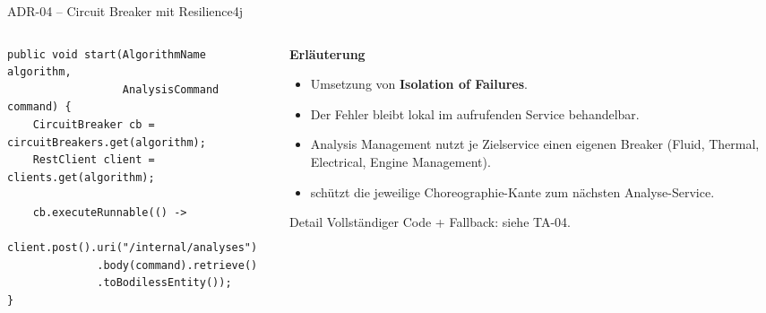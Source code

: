 \begin{frame}[fragile]{ADR-04 -- Circuit Breaker mit Resilience4j}
  \begin{columns}[T,onlytextwidth]
    \begin{column}{0.54\textwidth}
      \begin{lstlisting}[style=java]
public void start(AlgorithmName algorithm,
                  AnalysisCommand command) {
    CircuitBreaker cb = circuitBreakers.get(algorithm);
    RestClient client = clients.get(algorithm);

    cb.executeRunnable(() ->
        client.post().uri("/internal/analyses")
              .body(command).retrieve()
              .toBodilessEntity());
}
      \end{lstlisting}
    \end{column}
    \begin{column}{0.42\textwidth}
      \textbf{Erläuterung}
      \begin{itemize}
        \item Umsetzung von \textbf{Isolation of Failures}.
        \item Der Fehler bleibt lokal im aufrufenden Service behandelbar.
        \item Analysis Management nutzt je Zielservice einen eigenen Breaker
          (Fluid, Thermal, Electrical, Engine Management).
        \item {} schützt die jeweilige Choreographie-Kante
          zum nächsten Analyse-Service.
      \end{itemize}
      \begin{block}{Detail}
        \small Vollständiger Code + Fallback: siehe TA-04.
      \end{block}
    \end{column}
  \end{columns}
\end{frame}

